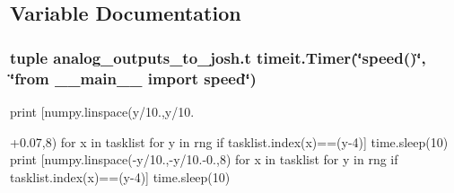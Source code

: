 \subsection{Variable Documentation}
\hypertarget{namespaceanalog__outputs__to__josh_ad465c78e048ca6ee6b2a92ca5479ec80}{
\subsubsection[{t}]{\setlength{\rightskip}{0pt plus 5cm}tuple analog\-\_\-outputs\-\_\-to\-\_\-josh.\-t timeit.\-Timer(\char`\"{}speed()\char`\"{}, \char`\"{}from \-\_\-\-\_\-main\-\_\-\-\_\- import speed\char`\"{})}}\label{namespaceanalog__outputs__to__josh_ad465c78e048ca6ee6b2a92ca5479ec80}


print \mbox{[}numpy.\-linspace(y/10.,y/10. 

+0.07,8) for x in tasklist for y in rng if tasklist.\-index(x)==(y-\/4)\mbox{]} time.\-sleep(10) print \mbox{[}numpy.\-linspace(-\/y/10.,-\/y/10.-\/0.,8) for x in tasklist for y in rng if tasklist.\-index(x)==(y-\/4)\mbox{]} time.\-sleep(10) 